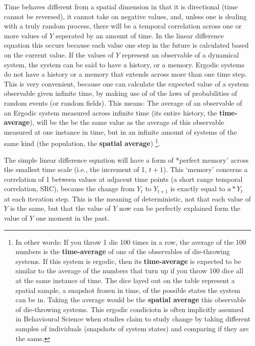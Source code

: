 \documentclass[12pt,]{book}
\let\rmarkdownfootnote\footnote%
\def\footnote{\protect\rmarkdownfootnote}
\theoremstyle{definition}
\theoremstyle{definition}
\theoremstyle{definition}
\theoremstyle{remark}
\begin{document}
Time behaves different from a spatial dimension in that it is
directional (time cannot be reversed), it cannot take on negative
values, and, unless one is dealing with a truly random process, there
will be a temporal correlation across one or more values of \(Y\)
seperated by an amount of time. In the linear difference equation this
occurs because each value one step in the future is calculated based on
the current value. If the values of \(Y\) represent an observable of a
dynamical system, the system can be said to have a history, or a memory.
Ergodic systems do not have a history or a memory that extends across
more than one time step. This is very convenient, because one can
calculate the expected value of a system observable given infinite time,
by making use of of the laws of probabilities of random events (or
random fields). This means: The average of an observable of an Ergodic
system measured across infinite time (its entire history, the
\textbf{time-average}), will be the be the same value as the average of
this observable measured at one instance in time, but in an infinite
amount of systems of the same kind (the population, the \textbf{spatial
average}) \footnote{In other words: If you throw 1 die 100 times in a
  row, the average of the 100 numbers is the \textbf{time-average} of
  one of the observables of die-throwing systems. If this system is
  ergodic, then its \textbf{time-average} is expected to be similar to
  the average of the numbers that turn up if you throw 100 dice all at
  the same instance of time. The dice layed out on the table represent a
  spatial sample, a snapshot frozen in time, of the possible states the
  system can be in. Taking the average would be the \textbf{spatial
  average} this observable of die-throwing systems. This ergodic
  condiciotn is often implicitly assumed in Behavioural Science when
  studies claim to study change by taking different samples of
  individuals (snapshots of system states) and comparing if they are the
  same.}.

The simple linear difference equation will have a form of *perfect
memory' across the smallest time scale (i.e., the increment of 1,
\(t+1\)). This `memory' concerns a correlation of 1 between values at
adjacent time points (a short range temporal correlation, SRC), because
the change from \(Y_t\) to \(Y_{t+1}\) is exactly equal to \(a * Y_t\)
at each iteration step. This is the meaning of deterministic, not that
each value of \(Y\) is the same, but that the value of \(Y\) now can be
perfectly explained form the value of \(Y\) one moment in the past.
\end{document}
